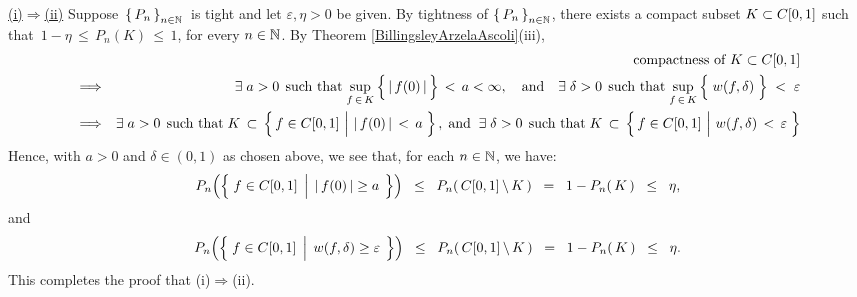 \proof
\vskip 0.2cm
\noindent
\underline{(i)\;$\Longrightarrow$\;(ii)}
\vskip 0.2cm
\noindent
Suppose \,$\left\{\,P_{n}\,\right\}_{n\in\mathbb{N}}$\, is tight and let $\varepsilon, \eta > 0$ be given.
By tightness of $\left\{\,P_{n}\,\right\}_{n\in\mathbb{N}}$, there exists a compact subset $K \subset C[0,1]$
such that \,$1 - \eta \,\leq\, P_{n}\!\left(K\right) \,\leq\, 1$, for every $n \in \mathbb{N}$.
By Theorem \ref{BillingsleyArzelaAscoli}(iii),
\begin{eqnarray*}
&&
	\textnormal{compactness of $K \subset \Czo$}
\\
&\Longrightarrow&
	\textnormal{$\exists\;a > 0$\;\,such that}\;
	\underset{f\,\in\,K}{\sup}\left\{\,\vert\,\overset{{\color{white}.}}{f}(0)\,\vert\,\right\} \,<\, a < \infty,
	\quad\textnormal{and}\quad
	\textnormal{$\exists$\;$\delta > 0$\;\,such that}\;
	\underset{f\,\in\,K}{\sup}\left\{\;\overset{{\color{white}:}}{w}(f,\delta)\;\right\}
	\;<\;\varepsilon
\\
&\Longrightarrow&
	\textnormal{$\exists\;a > 0$\;\,such that}\;
	K\,\subset\,
	\left\{\,
		f \in \Czo
		\,\left\vert\,\, \vert\,f(0)\,\vert\,\overset{{\color{white}.}}{<}\,a\right.
	\,\right\},
	\;\textnormal{and}\;\;
	\textnormal{$\exists$\;$\delta > 0$\;\,such that}\;
	K\,\subset\,
	\left\{\,
		f \in \Czo
		\,\left\vert\,\, w(f,\delta)\,\overset{{\color{white}.}}{<}\,\varepsilon\right.
	\,\right\}
\end{eqnarray*}
Hence, with $a > 0$ and $\delta \in (0,1)$ as chosen above, we see that,
for each $n \in \mathbb{N}$, we have:
\begin{equation*}
	P_{n}\!\left(\left\{\;
		f \in \Czo
		\;\left\vert\;\,
		\vert\,f(0)\,\vert \overset{{\color{white}.}}{\geq} a
		\right.
	\;\right\}\right)
	\;\;\leq\;\; P_{n}\!\left(\,\Czo\,\backslash\,K\,\right)
	\;\; = \;\; 1 - P_{n}\!\left(\,K\,\right)
	\;\;\leq\;\; \eta,
\end{equation*}
and
\begin{equation*}
	P_{n}\!\left(\left\{\;
		f \in \Czo
		\;\left\vert\;\,
		w(f,\delta) \overset{{\color{white}.}}{\geq} \varepsilon
		\right.
	\;\right\}\right)
	\;\;\leq\;\; P_{n}\!\left(\,\Czo\,\backslash\,K\,\right)
	\;\; = \;\; 1 - P_{n}\!\left(\,K\,\right)
	\;\;\leq\;\; \eta.
\end{equation*}
This completes the proof that (i)\;$\Longrightarrow$\;(ii).

